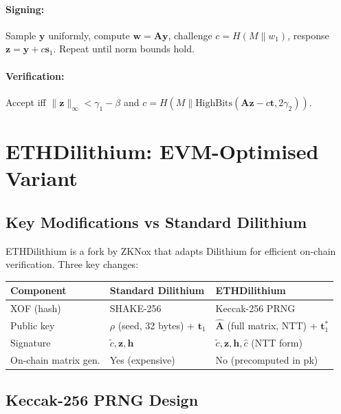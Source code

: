 \documentclass[11pt,a4paper]{article}
\begin{document}
\paragraph{Signing:} Sample $\mathbf{y}$ uniformly, compute $\mathbf{w} = \mathbf{A}\mathbf{y}$, challenge $c = H(M \| w_1)$, response $\mathbf{z} = \mathbf{y} + c\mathbf{s}_1$. Repeat until norm bounds hold.

\paragraph{Verification:} Accept iff $\|\mathbf{z}\|_\infty < \gamma_1 - \beta$ and $c = H(M \| \text{HighBits}(\mathbf{A}\mathbf{z} - c\mathbf{t}, 2\gamma_2))$.

\section{ETHDilithium: EVM-Optimised Variant}

\subsection{Key Modifications vs Standard Dilithium}

ETHDilithium is a fork by ZKNox that adapts Dilithium for efficient on-chain verification. Three key changes:

\begin{center}
\begin{tabular}{lll}
\toprule
\textbf{Component} & \textbf{Standard Dilithium} & \textbf{ETHDilithium} \\
\midrule
XOF (hash) & SHAKE-256 & Keccak-256 PRNG \\
Public key & $\rho$ (seed, 32 bytes) + $\mathbf{t}_1$ & $\hat{\mathbf{A}}$ (full matrix, NTT) + $\mathbf{t}_1^*$ \\
Signature & $\tilde{c}, \mathbf{z}, \mathbf{h}$ & $\tilde{c}, \mathbf{z}, \mathbf{h}, \hat{c}$ (NTT form) \\
On-chain matrix gen. & Yes (expensive) & No (precomputed in pk) \\
\bottomrule
\end{tabular}
\end{center}

\subsection{Keccak-256 PRNG Design}
\end{document}
